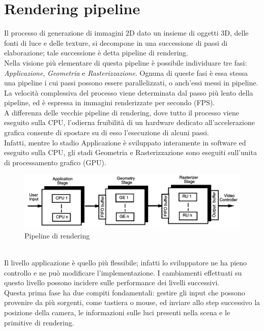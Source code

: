 \section{Rendering pipeline}
\label{sec:chapter_stato_arte_rendering_pipeline}

Il processo di generazione di immagini 2D dato un insieme di oggetti 3D, delle fonti di luce e delle texture, si decompone in una successione di passi di elaborazione; tale successione è detta pipeline di rendering.
\\
Nella visione più elementare di questa pipeline è possibile individuare tre fasi: \emph{Applicazione}, \emph{Geometria} e \emph{Rasterizzazione}.
Ognuna di queste fasi è essa stessa una pipeline i cui passi possono essere parallelizzati, o anch’essi messi in pipeline. La velocità complessiva del processo viene determinata dal passo più lento della pipeline, ed è espressa in immagini renderizzate per secondo (FPS).
\\
A differenza delle vecchie pipeline di rendering, dove tutto il processo viene eseguito sulla CPU, l’odierna fruibilità di un hardware dedicato all’accelerazione grafica consente di spostare su di esso l’esecuzione di alcuni passi. 
\\
Infatti, mentre lo stadio Applicazione è sviluppato interamente in software ed eseguito sulla CPU, gli stadi Geometria e Rasterizzazione sono eseguiti sull’unita di processamento grafico (GPU).
\\
\begin{figure}[htb]
 \centering
 \includegraphics[width=1.0\linewidth]{images/chapter_stato_arte/stato_arte_pipeline.png}\hfill
 \caption[Pipeline di rendering]{Pipeline di rendering}
 \label{fig:stato_arte_pipeline}
\end{figure}
\\
Il livello applicazione è quello più flessibile; infatti lo sviluppatore ne ha pieno controllo e ne può modificare l’implementazione. I cambiamenti effettuati su questo livello possono incidere sulle performance dei livelli successivi.
\\
Questa prima fase ha due compiti fondamentali: gestire gli input che possono provenire da più sorgenti, come tastiera o mouse, ed inviare allo step successivo la posizione della camera, le informazioni sulle luci presenti nella scena e le primitive di rendering.
